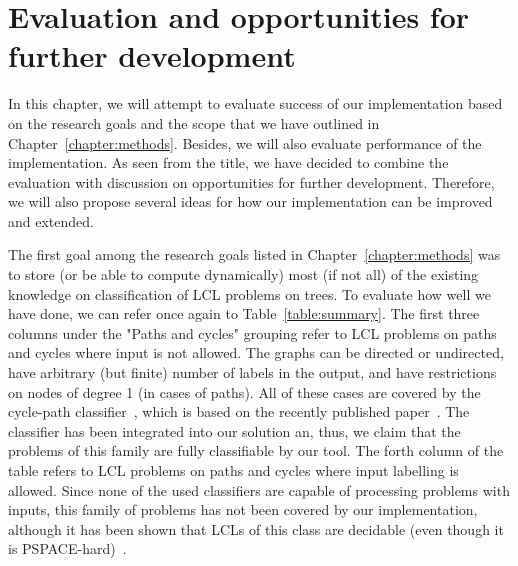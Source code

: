\chapter{Evaluation and opportunities for further development}
\label{chapter:evaluation}

In this chapter, we will attempt to evaluate success of our implementation
based on the research goals and the scope that we have outlined in Chapter~\ref{chapter:methods}.
Besides, we will also evaluate performance of the implementation. As seen from the title,
we have decided to combine the evaluation with discussion on opportunities for further
development. Therefore, we will also propose several ideas for how our implementation
can be improved and extended.

The first goal among the research goals listed in Chapter~\ref{chapter:methods}
was to store (or be able to compute dynamically) most
(if not all) of the existing knowledge on classification of LCL problems on trees.
To evaluate how well we have done, we can refer once again to Table~\ref{table:summary}.
The first three columns under the "Paths and cycles" grouping refer to LCL problems on
paths and cycles where input is not allowed. The graphs can be directed or undirected,
have arbitrary (but finite) number of labels in the output, and have restrictions
on nodes of degree 1 (in cases of paths). All of these cases are covered by
the cycle-path classifier~\cite{FIXME}, which is based on the recently
published paper~\cite{FIXME}. The classifier has been integrated into our
solution an, thus, we claim that the problems of this family are fully classifiable by our tool.
The forth column of the table refers to LCL problems on paths and cycles
where input labelling is allowed. Since none of the used classifiers
are capable of processing problems with inputs, this family of problems
has not been covered by our implementation, although it has been shown that
LCLs of this class are decidable (even though it is PSPACE-hard)~\cite{Balliu2018}.






